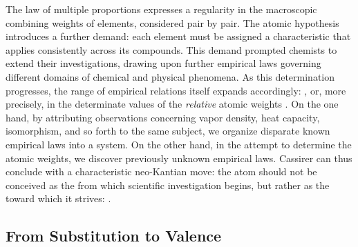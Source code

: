 \documentclass[submitted,12pt]{article}
\begin{document}
The law of multiple proportions expresses a regularity in the macroscopic combining weights of elements, considered pair by pair. The atomic hypothesis introduces a further demand: each element must be assigned a characteristic  that applies consistently across its compounds. This demand prompted chemists to extend their investigations, drawing upon further empirical laws governing different domains of chemical and physical phenomena. As this determination progresses, the range of empirical relations itself expands accordingly: , or, more precisely, in the determinate values of the \emph{relative} atomic weights . On the one hand, by attributing observations concerning vapor density, heat capacity, isomorphism, and so forth to the same subject, we organize disparate known empirical laws into a system. On the other hand, in the attempt to determine the atomic weights, we discover previously unknown empirical laws. Cassirer can thus conclude with a characteristic neo-Kantian move: the atom should not be conceived as the  from which scientific investigation begins, but rather as the  toward which it strives:  .  

\subsection{From Substitution to Valence}
\end{document}
